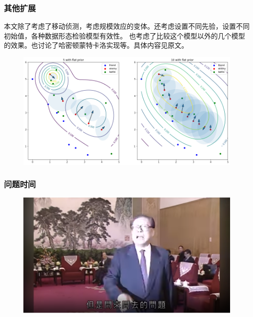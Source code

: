 \documentclass{beamer}
\begin{document}
\begin{frame}

\frametitle{其他扩展}

本文除了考虑了移动侦测，考虑规模效应的变体。还考虑设置不同先验，设置不同初始值，各种数据形态检验模型有效性。
也考虑了比较这个模型以外的几个模型的效果。也讨论了哈密顿蒙特卡洛实现等。具体内容见原文。

\begin{figure}[htb]
\includegraphics[width=0.7\linewidth]{exist_density.png}
\label{fig:gettysburgInit}
\end{figure}

\end{frame}

\begin{frame}

\frametitle{问题时间}

\begin{figure}[htb]
\includegraphics[width=0.9\linewidth]{elder.png}
\end{figure}

\end{frame}
\end{document}
